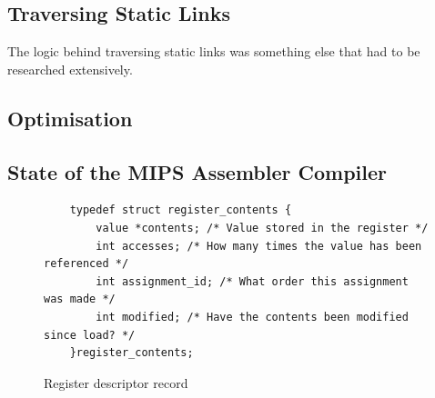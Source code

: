 \subsection{Traversing Static Links}
\label{sec:staticlinks}
The logic behind traversing static links was something else that had to be researched extensively. 

\subsection{Optimisation}

\subsection{State of the MIPS Assembler Compiler}

\begin{figure}[p]
	\begin{verbatim}
	typedef struct register_contents {
	    value *contents; /* Value stored in the register */
	    int accesses; /* How many times the value has been referenced */
	    int assignment_id; /* What order this assignment was made */
	    int modified; /* Have the contents been modified since load? */
	}register_contents;
	\end{verbatim}
	\caption{Register descriptor record}
	\label{fig:descriptor}
\end{figure}

